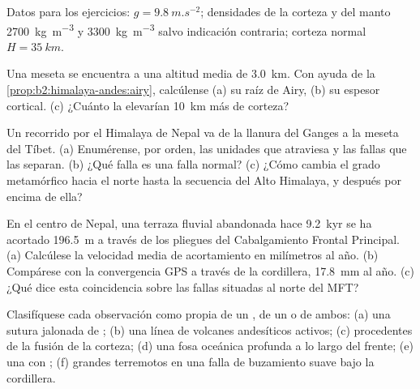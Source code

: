 Datos para los ejercicios: $g = \qty{9.8}{m.s^{-2}}$; densidades de la corteza y del manto
\qty{2700}{kg.m^{-3}} y \qty{3300}{kg.m^{-3}} salvo indicación contraria; corteza normal $H =
\qty{35}{km}$.

\begin{exercise}[$\star$]\label{exo:b2:himalaya-andes:1}
Una meseta se encuentra a una altitud media de \qty{3.0}{km}. Con ayuda de la
\cref{prop:b2:himalaya-andes:airy}, calcúlense (a) su raíz de Airy, (b) su espesor cortical.
(c) ¿Cuánto la elevarían \qty{10}{km} más de corteza?
\end{exercise}

\begin{exercise}[$\star$]\label{exo:b2:himalaya-andes:2}
Un recorrido por el Himalaya de Nepal va de la llanura del Ganges a la meseta del Tíbet.
(a) Enumérense, por orden, las unidades que atraviesa y las fallas que las separan. (b) ¿Qué falla
es una falla normal? (c) ¿Cómo cambia el grado metamórfico hacia el norte hasta la secuencia del Alto
Himalaya, y después por encima de ella?
\end{exercise}

\begin{exercise}[$\star$]\label{exo:b2:himalaya-andes:3}
En el centro de Nepal, una terraza fluvial abandonada hace \qty{9.2}{kyr} se ha acortado
\qty{196.5}{m} a través de los pliegues del Cabalgamiento Frontal Principal. (a) Calcúlese la velocidad media de
acortamiento en milímetros al año. (b) Compárese con la convergencia GPS a través de la cordillera,
\qty{17.8}{mm} al año. (c) ¿Qué dice esta coincidencia sobre las fallas situadas al norte del MFT?
\end{exercise}

\begin{exercise}[$\star$]\label{exo:b2:himalaya-andes:4}
Clasifíquese cada observación como propia de un , de un  o de ambos: (a) una sutura jalonada
de ; (b) una línea de volcanes andesíticos activos; (c)  procedentes de la fusión de la
corteza; (d) una fosa oceánica profunda a lo largo del frente; (e) una  con ;
(f) grandes terremotos en una falla de buzamiento suave bajo la cordillera.
\end{exercise}

